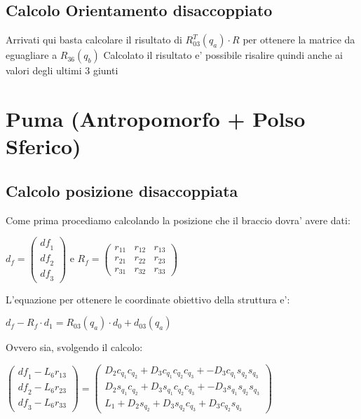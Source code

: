 \documentclass[a4paper,12pt]{article}
\begin{document}
\subsection{Calcolo Orientamento disaccoppiato}
Arrivati qui basta calcolare il risultato di $ R_{03}^T(q_a) \cdot R $ per ottenere la matrice da eguagliare a $R_{36}(q_b)$
Calcolato il risultato e' possibile risalire quindi anche ai valori degli ultimi 3 giunti

\newpage

\section{Puma (Antropomorfo + Polso Sferico)}
\subsection{Calcolo posizione disaccoppiata}
Come prima procediamo calcolando la posizione che il braccio dovra' avere dati:
\begin{center}
 $d_f=\begin{pmatrix}{{\mathit{df}}_1}\\
{{\mathit{df}}_2}\\
{{\mathit{df}}_3}\end{pmatrix}$ e $R_f=\begin{pmatrix}{r_{11}} & {r_{12}} & {r_{13}}\\
{r_{21}} & {r_{22}} & {r_{23}}\\
{r_{31}} & {r_{32}} & {r_{33}}\end{pmatrix}$
\end{center}

L'equazione per ottenere le coordinate obiettivo della struttura e':
\begin{center}
$d_f- R_f \cdot d_1 = R_{03}(q_a) \cdot d_0 + d_{03}(q_a)$ 

Ovvero sia, svolgendo il calcolo:

$\begin{pmatrix}{{\mathit{df}}_1}-{L_6} {r_{13}}\\
{{\mathit{df}}_2}-{L_6} {r_{23}}\\
{{\mathit{df}}_3}-{L_6} {r_{33}}\end{pmatrix}=\begin{pmatrix}{D_2} {c_{{q_1}}} {c_{{q_2}}}+{D_3} {c_{{q_1}}} {c_{{q_2}}} {c_{{q_3}}}+-{D_3} {c_{{q_1}}} {s_{{q_2}}} {s_{{q_3}}}\\
{D_2} {s_{{q_1}}} {c_{{q_2}}}+{D_3} {s_{{q_1}}} {c_{{q_2}}} {c_{{q_3}}}+-{D_3} {s_{{q_1}}} {s_{{q_2}}} {s_{{q_3}}}\\
{L_1}+{D_2} {s_{{q_2}}}+{D_3} {s_{{q_2}}} {c_{{q_3}}}+{D_3} {c_{{q_2}}} {s_{{q_3}}}\end{pmatrix}$
\end{center}
\end{document}

